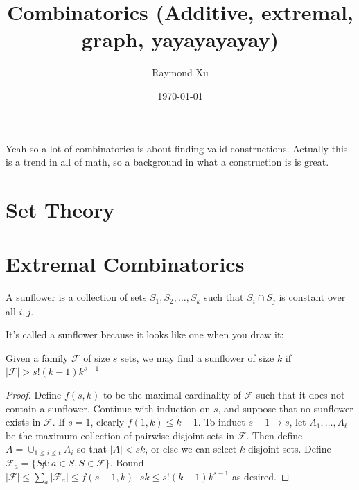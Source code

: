 \documentclass[11pt]{scrartcl}
\theoremstyle{plain} %
\theoremstyle{definition}
\theoremstyle{remark}
\theoremstyle{empty}
\theoremstyle{empty}
\theoremstyle{empty}
\theoremstyle{empty}
\theoremstyle{empty}
\theoremstyle{empty}
\theoremstyle{empty}
\begin{document}



\title{Combinatorics (Additive, extremal, graph, yayayayayay)}
\author{Raymond Xu}
\date{\today}
\maketitle

\begin{abstract}
\end{abstract}

\tableofcontents

\eject

Yeah so a lot of combinatorics is about finding valid constructions. Actually this is a trend in all of math, so a background in what a construction is is great. 

\section{Set Theory}

\section{Extremal Combinatorics}

\begin{definition}[Sunflower]
    A sunflower is a collection of sets $S_1, S_2, \ldots, S_k$ such that $S_i \cap S_j$ is constant over all $i,j$. 
\end{definition}

It's called a sunflower because it looks like one when you draw it: 

\begin{theorem}
    Given a family $\mathcal F$ of size $s$ sets, we may find a sunflower of size $k$ if $|\mathcal F| > s!(k-1)k^{s-1}$
\end{theorem}

\begin{proof}
  Define $f(s,k)$ to be the maximal cardinality of $\mathcal F$ such that it does not contain a sunflower. Continue with induction on $s$, and suppose that no sunflower exists in $\mathcal F$. If $s=1$, clearly $f(1, k) \le k-1$. To induct $s-1 \to s$, let $A_1, \ldots, A_t$ be the maximum collection of pairwise disjoint sets in $\mathcal F$. Then define $A = \cup_{1 \le i \le t} A_i$ so that $|A| < sk$, or else we can select $k$ disjoint sets. Define $\mathcal F_a = \{S\not a : a \in S, S \in \mathcal F\}$. Bound $|\mathcal F| \le \sum_a |\mathcal F_a| \le f(s-1, k)\cdot sk \le s!(k-1)k^{s-1}$ as desired. 
\end{proof}
\end{document}
